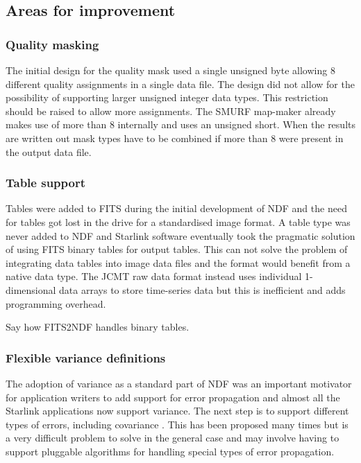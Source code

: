 \documentclass[final,authoryear,5p,times,twocolumn]{elsarticle}
\begin{document}
\subsection{Areas for improvement}

\subsubsection{Quality masking}

The initial design for the quality mask used a single unsigned byte
allowing 8 different quality assignments in a single data file. The
design did not allow for the possibility of supporting larger unsigned
integer data types. This restriction should be raised to allow more
assignments. The SMURF map-maker
\citep[][ascl:1310.007]{2013MNRAS.430.2545C} already makes use of more
than 8 internally and uses an unsigned short. When the results are
written out mask types have to be combined if more than 8 were present
in the output data file.

\subsubsection{Table support}

Tables were added to FITS \citep{1988A&AS...73..365H} during the
initial development of NDF and the need for tables got lost in the
drive for a standardised image format. A table type was never added to
NDF and Starlink software eventually took the pragmatic solution of
using FITS binary tables \citep{1995A&AS..113..159C} for output
tables. This can not solve the problem of integrating data tables into
image data files and the format would benefit from a native data
type. The JCMT raw data format instead uses individual 1-dimensional
data arrays to store time-series data but this is inefficient and adds
programming overhead.

{\color{red} Say how FITS2NDF handles binary tables.}

\subsubsection{Flexible variance definitions}

The adoption of variance as a standard part of NDF was an important
motivator for application writers to add support for error propagation and
almost all the Starlink applications now support variance. The next
step is to support different types of errors, including
covariance \citep[see e.g.][]{1992ESOC...41...47M}. This has been proposed many times \citep[see
e.g.][]{1991STARB...8...19M} but is a very difficult problem to solve
in the general case and may involve having to support pluggable
algorithms for handling special types of error propagation.
\end{document}
